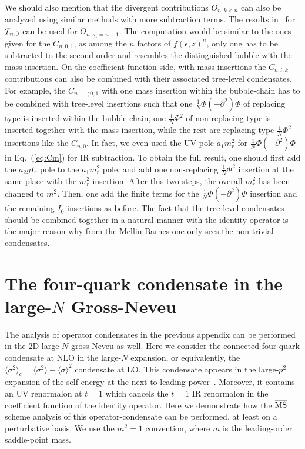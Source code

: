 \documentclass[a4paper,11pt]{article}
\begin{document}
We should also mention that the divergent contributions $O_{n,k<n}$ can also be analyzed using similar methods with more subtraction terms. The results in~\cite{Marino:2021six} for 
${\cal I}_{n,0}$ can be used for $O_{n,s_1=n-1}$. The computation would be similar to the ones given for the $C_{n;0,1}$, as among the $n$ factors of $f(\epsilon,z)^n$, only one has to be subtracted to the second order and resembles the distinguished bubble with the mass insertion. On the coefficient function side, with mass insertions the $C_{n;l,k}$ contributions can also be combined with their associated tree-level condensates. For example, the $C_{n-1;0,1}$ with one mass insertion within the bubble-chain has to be combined with tree-level insertions such that one $\frac{1}{N}\Phi(-\partial^2) \Phi$ of replacing type is inserted within the bubble chain, one $\frac{1}{N}\Phi^2$ of non-replacing-type is inserted together with the mass insertion, while the rest are replacing-type $\frac{1}{N}\Phi^2$ insertions like the $C_{n,0}$. In fact, we even used the UV pole $a_1m_r^2$ for $\frac{1}{N}\Phi(-\partial^2) \Phi$ in Eq.~(\ref{eq:Cm}) for IR subtraction. To obtain the full result, one should first add the $a_2gI_r$ pole to the $a_1m_r^2$ pole, and add one non-replacing $\frac{1}{N}\Phi^2$ insertion at the same place with the $m_r^2$ insertion. After this two steps, the overall $m_r^2$ has been changed to $m^2$. Then, one add the finite terms for the $\frac{1}{N}\Phi(-\partial^2) \Phi$ insertion and the remaining $I_0$ insertions as before. The fact that the tree-level condensates should be combined together in a natural manner with the identity operator is the major reason why from the Mellin-Barnes one only sees the non-trivial condensates. 

\section{The four-quark condensate in the large-$N$ Gross-Neveu}
The analysis of operator condensates in the previous appendix can be performed in the 2D large-$N$ gross Neveu as well. Here we consider the connected four-quark condensate at NLO in the large-$N$ expansion, or equivalently, the $\langle \sigma^2\rangle_c=\langle \sigma^2\rangle-\langle\sigma\rangle^2$ condensate at LO. This condensate appears in the large-$p^2$ expansion of the self-energy at the next-to-leading power~\cite{Marino:2024uco}. Moreover, it contains an UV renormalon at $t=1$ which cancels the $t=1$ IR renormalon in the coefficient function of the identity operator. Here we demonstrate how the $\overline{\rm MS}$ scheme analysis of this operator-condensate can be performed, at least on a perturbative basis. We use the $m^2=1$ convention, where $m$ is the leading-order saddle-point mass. 
\end{document}
